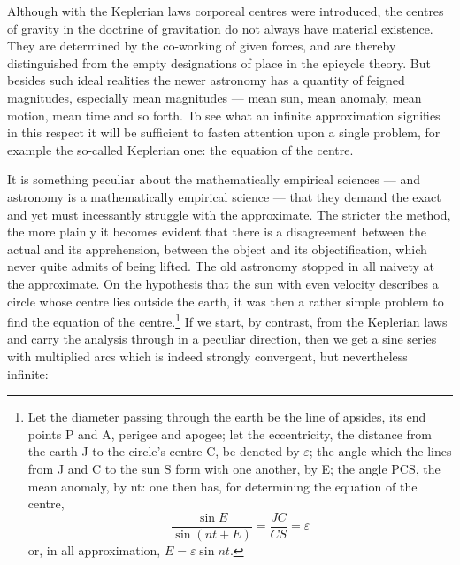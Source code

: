 \documentclass[12pt,a4paper]{book}
\renewcommand{\thefootnote}{*)}
\begin{document}
Although with the Keplerian laws corporeal centres were introduced, the centres of gravity in the doctrine of
gravitation do not always have material existence. They are determined by the co-working of given forces, and
are thereby distinguished from the empty designations of place in the epicycle theory. But besides such ideal
realities the newer astronomy has a quantity of feigned magnitudes, especially mean magnitudes --- mean sun,
mean anomaly, mean motion, mean time and so forth. To see what an infinite approximation signifies in this
respect it will be sufficient to fasten attention upon a single problem, for example the so-called Keplerian
one: the equation of the centre.

It is something peculiar about the mathematically empirical sciences --- and astronomy is a mathematically
empirical science --- that they demand the exact and yet must incessantly struggle with the approximate. The
stricter the method, the more plainly it becomes evident that there is a disagreement between the actual and
its apprehension, between the object and its objectification, which never quite admits of being lifted. The
old astronomy stopped in all naivety at the approximate. On the hypothesis that the sun with even velocity
describes a circle whose centre lies outside the earth, it was then a rather simple problem to
find the equation of the centre.\footnote{%
Let the diameter passing through the earth be the line of apsides, its end points P and A, perigee and
apogee; let the eccentricity, the distance from the earth J to the circle's centre C, be denoted by
$\varepsilon$; the angle which the lines from J and C to the sun S form with one another, by E; the angle
PCS, the mean anomaly, by nt: one then has, for determining the equation of the centre,
\[
\frac{\sin E}{\sin (nt + E)} = \frac{JC}{CS} = \varepsilon
\]
or, in all approximation, $E = \varepsilon \sin nt$.}
If we start, by contrast, from the Keplerian laws and carry the analysis through in a peculiar direction, then
we get a sine series with multiplied arcs which is indeed strongly convergent, but nevertheless infinite:%
\renewcommand{\thefootnote}{**)}%
\end{document}
